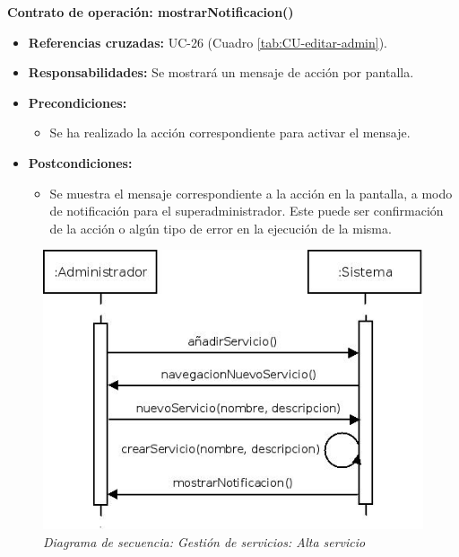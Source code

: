 \textbf{Contrato de operación: mostrarNotificacion()}
\begin{itemize}
\item \textbf{Referencias cruzadas:} UC-26 (Cuadro \ref{tab:CU-editar-admin}).
\item \textbf{Responsabilidades:} Se mostrará un mensaje de acción por pantalla.
\item \textbf{Precondiciones:} 
 \begin{itemize}
\item Se ha realizado la acción correspondiente para activar el mensaje.
\end {itemize}
\item \textbf{Postcondiciones:} 
 \begin{itemize}
\item Se muestra el mensaje correspondiente a la acción en la pantalla, a modo de notificación para el superadministrador. Este puede ser confirmación de la acción o algún tipo de error en la ejecución de la misma.
\end {itemize}
\end {itemize}


\vspace{10mm}

\begin{figure}[H]
\centering
  \includegraphics[scale=.55]{img/secuencias/gestion-servicios-alta-servicio.jpeg}
  \caption{\textit{Diagrama de secuencia: Gestión de servicios: Alta servicio}}
  \label{fig:secuencia-gestion-servicios-alta-servicio}
\end{figure}

